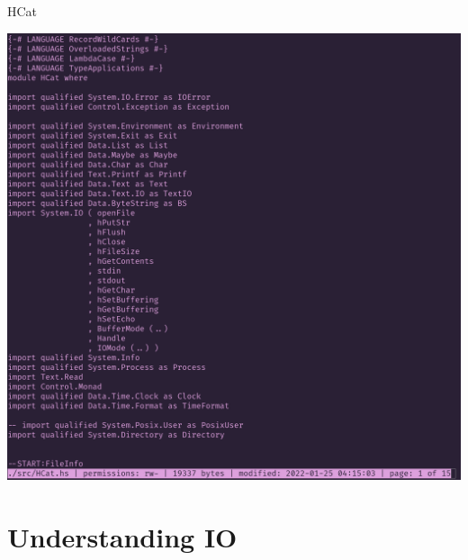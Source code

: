 \documentclass[10pt, presentation, colorlinks]{beamer}
\begin{document}
\begin{frame}[label={sec:org6212e2b}]{HCat}
\begin{center}
\includegraphics[height=0.7\textheight]{./img/hcat-screen.png}
\end{center}
\end{frame}

\section{Understanding IO}
\label{sec:org427bd23}
\end{document}
